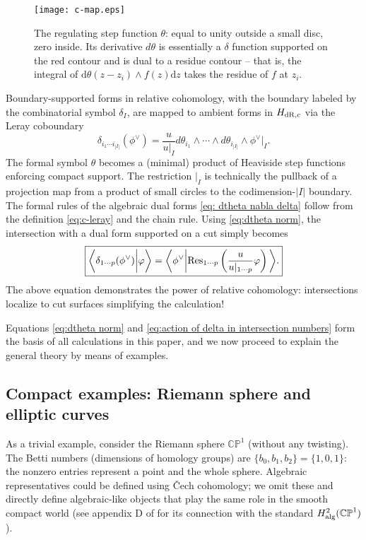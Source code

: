 \documentclass[11pt]{article}
\renewcommand{\d}{\text{d}}
\newcommand{\be}{\begin{equation}}
\newcommand{\ee}{\end{equation}}
\newcommand{\la}{\langle}
\newcommand{\ra}{\rangle}
\newcommand{\CP}{\mathbb{CP}}
\newcommand{\res}{{\rm Res}}
\newcommand{\dr}{{\rm dR}}
\newcommand{\vphi}{\varphi}
\begin{document}
\begin{figure}[t]
\centering
\texttt{[image: c-map.eps]}
\caption{
	\label{fig:dtheta}
 The regulating step function $\theta$: equal to unity outside a small disc, zero inside.
Its derivative $d\theta$ is essentially a $\delta$ function supported on the red contour and is dual to a residue contour
-- that is, the integral of $\d\theta(z-z_i)\wedge f(z) \d z$ takes the residue of $f$ at $z_i$.
}
\end{figure}


Boundary-supported forms in relative cohomology, with the boundary labeled by the combinatorial symbol $\delta_I$, are mapped to
ambient forms in $H_{\dr,c}$ via the Leray coboundary
\be \label{eq:c-leray}
\boxed{
	\delta_{i_1 \cdots i_{|I|}}(\phi^\vee) = \frac{u}{u\vert_I}
	d\theta_{i_{1}} \wedge \cdots \wedge d\theta_{i_{|I|}} \wedge \phi^\vee\vert_I.
	}
\ee
The formal symbol $\theta$ becomes a (minimal) product of Heaviside step functions enforcing compact support.
The restriction $\vert_I$ is technically the pullback of a projection map from a product of small circles to the codimension-$|I|$ boundary.
The formal rules of the algebraic dual forms \eqref{eq: dtheta nabla delta} follow from the definition \eqref{eq:c-leray} and the chain rule. Using \eqref{eq:dtheta norm}, the intersection with a dual form supported on a cut simply becomes
\be \label{eq:action of delta in intersection numbers}
	\boxed{
	\bigg\la \delta_{1 \cdots p} ( \phi^\vee ) \bigg\vert \vphi \bigg\ra
	= \bigg\la \phi^\vee \bigg\vert \res_{1 \cdots p} \left(\frac{u}{u\vert_{1 \cdots p}} \vphi \right) \bigg\ra.
	}
\ee
The above equation demonstrates the power of relative cohomology: intersections localize to cut surfaces simplifying the calculation!

Equations \eqref{eq:dtheta norm} and \eqref{eq:action of delta in intersection numbers} form the basis of all calculations in this paper,
and we now proceed to explain the general theory by means of examples.


\subsection{Compact examples: Riemann sphere and elliptic curves \label{sec:compact ex}}


As a trivial example, consider the Riemann sphere $\CP^1$ (without any twisting).
The Betti numbers (dimensions of homology groups) are $\{b_0,b_1,b_2\}= \{1,0,1\}$: the nonzero
entries represent a point and the whole sphere.
Algebraic representatives could be defined using \v{C}ech cohomology; we omit these
and directly define algebraic-like objects that play the same role in the smooth compact world
(see appendix D of \cite{Caron-Huot:2021xqj} for its connection with the standard $H^2_{\rm alg}(\CP^1)$).
\end{document}
